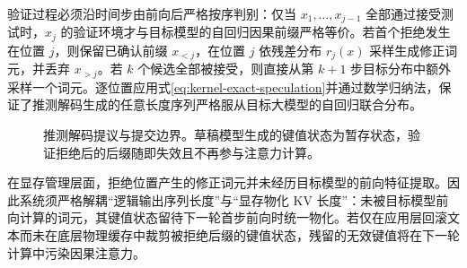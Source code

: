 \documentclass[../textbook.tex]{subfiles}
\begin{document}
验证过程必须沿时间步由前向后严格按序判别：仅当 $x_1,\ldots,x_{j-1}$ 全部通过接受测试时，$x_j$ 的验证环境才与目标模型的自回归因果前缀严格等价。若首个拒绝发生在位置 $j$，则保留已确认前缀 $x_{<j}$，在位置 $j$ 依残差分布 $r_j(x)$ 采样生成修正词元，并丢弃 $x_{>j}$。若 $k$ 个候选全部被接受，则直接从第 $k+1$ 步目标分布中额外采样一个词元。逐位置应用式\eqref{eq:kernel-exact-speculation}并通过数学归纳法，保证了推测解码生成的任意长度序列严格服从目标大模型的自回归联合分布。

\begin{figure}[htbp]
\centering
{}
\caption[推测解码提议与提交边界]{推测解码提议与提交边界。草稿模型生成的键值状态为暂存状态，验证拒绝后的后缀随即失效且不再参与注意力计算。}\label{fig:kernel-speculation}
\end{figure}

在显存管理层面，拒绝位置产生的修正词元并未经历目标模型的前向特征提取。因此系统须严格解耦“逻辑输出序列长度”与“显存物化 KV 长度”：未被目标模型前向计算的词元，其键值状态留待下一轮首步前向时统一物化。若仅在应用层回滚文本而未在底层物理缓存中裁剪被拒绝后缀的键值状态，残留的无效键值将在下一轮计算中污染因果注意力。
\end{document}
